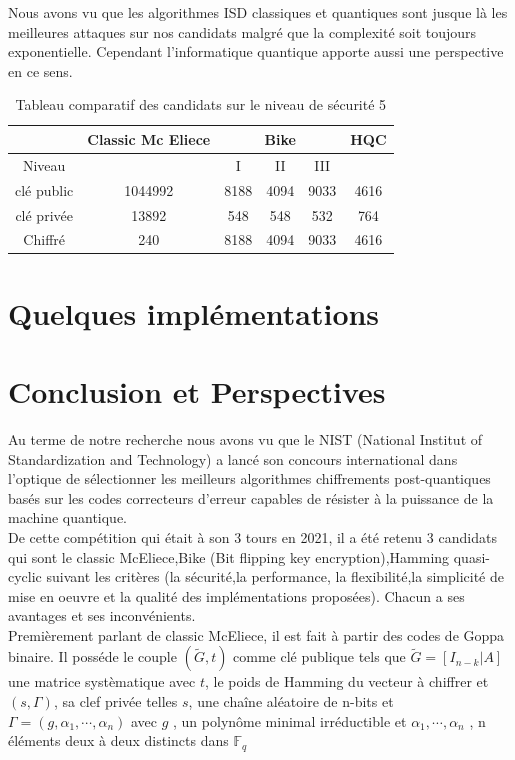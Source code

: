 \documentclass[12pt,openany]{report}
\begin{document}
Nous avons vu que les algorithmes ISD classiques et quantiques sont  jusque là les meilleures attaques sur nos candidats malgré que la complexité soit toujours exponentielle. Cependant l'informatique quantique apporte aussi une perspective en ce sens.

\begin{table}
\centering

\begin{tabular}{|c||c|c|c|c|c|} 
\hline

\multicolumn{1}{|c||}{} &  \multicolumn{1}{c|}{Classic Mc Eliece}&  \multicolumn{3}{c|}{Bike}&  \multicolumn{1}{c|}{HQC} \\ 
 \hline
 \cline{3-5}
Niveau &         & I &  II &   III &    \\
\hline
clé public & 1044992 & 8188 & 4094 & 9033 & 4616 \\
\hline
clé privée & 13892 & 548 & 548 & 532 & 764 \\
\hline
Chiffré & 240 & 8188 & 4094 & 9033 & 4616 \\
\hline
 
\end{tabular}
\caption{Tableau comparatif des candidats sur le niveau de sécurité 5}
\label{comparatif}

\end{table}
\chapter{Quelques implémentations }

\chapter{Conclusion et Perspectives}

Au terme de notre recherche nous avons vu que le NIST (National Institut of Standardization and Technology) a lancé son concours international dans l'optique de sélectionner les meilleurs algorithmes chiffrements post-quantiques basés sur les codes correcteurs d'erreur capables de résister à la puissance de la machine quantique.\\
De cette compétition qui était à son 3 tours en 2021, il a été retenu 3 candidats qui sont le classic McEliece,Bike (Bit flipping key encryption),Hamming quasi-cyclic suivant les critères (la sécurité,la performance, la flexibilité,la simplicité de mise en oeuvre et la qualité des implémentations proposées). Chacun a ses avantages et ses inconvénients.\\
Premièrement parlant de classic McEliece, il est fait à partir des codes de Goppa binaire. Il posséde le couple  $  (  \tilde{G},t  )$ comme clé publique tels que $ \tilde{G}=[I_{n-k}|A]$ une matrice systèmatique avec $ t$, le poids de Hamming du vecteur à chiffrer et $ (s, \Gamma)   $, sa clef privée telles $s$, une chaîne aléatoire de n-bits et $  \Gamma=(g,\alpha_1,\cdots,\alpha_n)   $ avec $g$ , un polynôme minimal irréductible et $  \alpha_1,\cdots,\alpha_n  $ , n éléments deux à deux distincts dans $ \mathbb{F}_q   $
\end{document}
